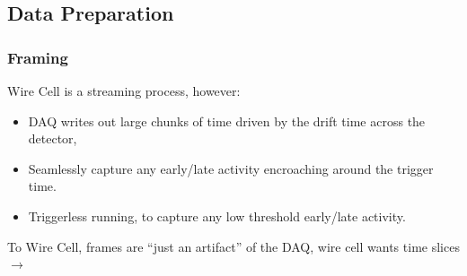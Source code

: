 \documentclass[xcolor=dvipsnames]{beamer}
\begin{document}
\subsection{Data Preparation}

\begin{frame}
  \frametitle{Framing}
  
  \vspace{-25mm}
  \begin{center}
  \end{center}

  \vspace{-10mm}

  \scriptsize
  Wire Cell is a streaming process, however:
  \begin{itemize}
  \item DAQ writes out large chunks of time driven by the drift time
    across the detector,
  \item Seamlessly capture any early/late activity
    encroaching around the trigger time.
  \item Triggerless running, to capture any low threshold early/late activity.
  \end{itemize}

  \vfill

  To Wire Cell, frames are ``just an artifact'' of the DAQ, wire cell wants time slices $\rightarrow$



      

\end{frame}
\end{document}
